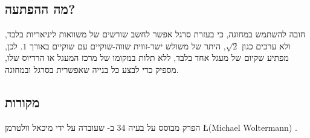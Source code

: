 
\subsection*{מה ההפתעה?}

חובה להשתמש במחוגה, כי בעזרת סרגל אפשר לחשב שורשים של משוואות ליניאריות בלבד, ולא ערכים כגון
$\sqrt{2}$,
היתר של משולש ישר-זווית שווה-שוקיים עם שוקיים באורך
$1$.
לכן, מפתיע שקיום של מעגל אחד בלבד, ללא תלות במקומו של מרכז המעגל או הרדיוס שלו, מספיק כדי לבצע כל בנייה שאפשרית בסרגל ובמחוגה.


\subsection*{מקורות}
הפרק מבוסס על בעיה 34
ב-%
\cite{dorrie1}
שעובדה על ידי מיכאל וולטרמן
\L{(Michael Woltermann)} \cite{dorrie2}. 
